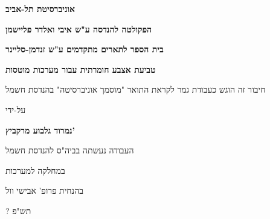 \begin{otherlanguage}{hebrew}
\begin{center}
\begin{davidfont}
  \vspace*{1cm}
  
  \large
  \textbf{אוניברסיטת תל-אביב}
  
  \footnotesize
  \textbf{הפקולטה להנדסה ע"ש איבי ואלדר פליישמן}
   
  \textbf{בית הספר לתארים מתקדמים ע"ש זנדמן-סליינר}
   
  \vspace{1.2cm}
  \LARGE
  \textbf{טביעת אצבע חומרתית עבור מערכות מוטסות}
  
  \vspace{0.5cm}
   
  \vspace{1cm}
  \normalsize
  חיבור זה הוגש כעבודת גמר לקראת התואר "מוסמך אוניברסיטה" בהנדסת חשמל
   
  \vspace{0.5cm}
  על-ידי
   
  \Large
  \textbf{נמרוד גלבוע מרקביץ'}
   
  \vspace{1 cm}
  \normalsize
  העבודה נעשתה בביה"ס להנדסת חשמל
  
  במחלקה למערכות
   
  \vspace{0.5cm}
  
  בהנחית פרופ' אבישי וול
   
  \vspace{0.5cm}
  \large
  ? תש"פ
\end{davidfont}
\end{center}
\end{otherlanguage}
